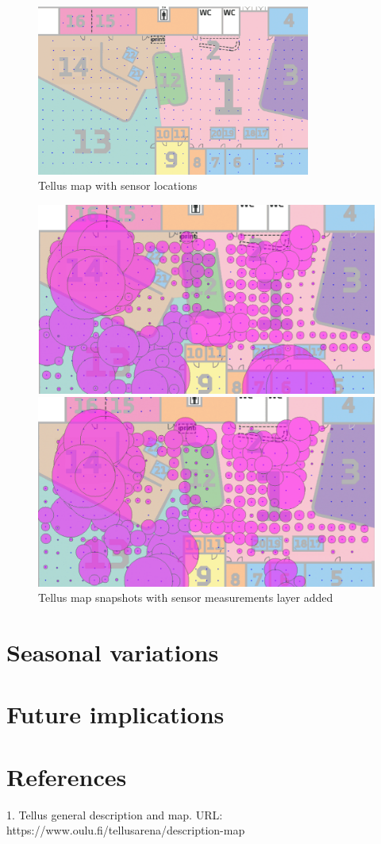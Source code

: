 \documentclass{article}
\begin{document}
\begin{figure}[ht!]
  \centering
  \includegraphics[width=90mm]{./tellus_map_sensor_locations.png}
  \caption{Tellus map with sensor locations}
\end{figure}

\begin{figure}[ht!]
  \centering
  \begin{minipage}{.5\textwidth}
    \centering
    \includegraphics[width=.95\linewidth]{./tellus_map_sensor_data_1.png}
  \end{minipage}%
  \begin{minipage}{.5\textwidth}
    \centering
    \includegraphics[width=.95\linewidth]{./tellus_map_sensor_data_2.png}
  \end{minipage}
  \caption{Tellus map snapshots with sensor measurements layer added}
\end{figure}

\section{Seasonal variations}

\section{Future implications}

\section{References}

1. Tellus general description and map. URL: https://www.oulu.fi/tellusarena/description-map
\end{document}
